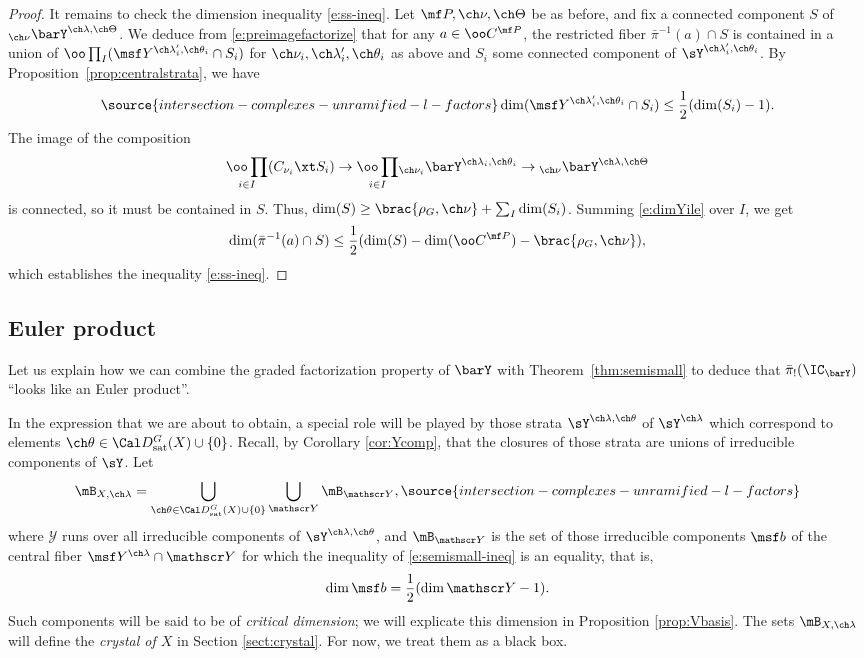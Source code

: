 \begin{proof}
It remains to check the dimension inequality \eqref{e:ss-ineq}.
Let $\mf P, \ch\nu, \ch\Theta$ be as before, and
fix a connected component $S$ of $_{\ch\nu}\barY^{\ch\lambda,\ch\Theta}$.
We deduce from
\eqref{e:preimagefactorize} that for any $a \in \oo C^{\mf P}$,
the restricted fiber
$\bar\pi^{-1}(a) \cap S$
is contained in a union of
$\oo\prod_I (\msf Y^{\ch\lambda'_i,\ch\theta_i}\cap S_i)$ for
$\ch\nu_i,\ch\lambda'_i,\ch\theta_i$ as above
and $S_i$ some connected component of $\sY^{\ch\lambda'_i,\ch\theta_i}$.
By Proposition~\ref{prop:centralstrata}, we have
\begin{equation}  \label{e:dimYile}
\source{intersection-complexes-unramified-l-factors}
\dim( \msf Y^{\ch\lambda'_i, \ch\theta_i} \cap S_i ) \le
\frac 1 2 ( \dim(S_i) - 1 ).
\end{equation}
The image of the composition
\[ \underset{i\in I}{\oo\prod} (C_{\nu_i} \xt S_i) \to \underset{i\in I}{\oo\prod}
{_{\ch\nu_i} \barY^{\ch\lambda_i,\ch\theta_i} } \to {_{\ch\nu}\barY^{\ch\lambda,\ch\Theta}} \]
is connected, so it must be contained in $S$.
Thus, $\dim(S) \ge \brac{\rho_G,\ch\nu} + \sum_I \dim(S_i)$.
Summing \eqref{e:dimYile} over $I$, we get
\[ \dim( \bar\pi^{-1}(a) \cap S ) \le
\frac 1 2 ( \dim(S) - \dim( \oo C^{\mf P} )- \brac{\rho_G,\ch\nu}  ), \]
which establishes the inequality \eqref{e:ss-ineq}.
\end{proof}

\subsection{Euler product}
Let us explain how we can combine the graded
factorization property of $\barY$ with
Theorem~\ref{thm:semismall} to deduce that
$\bar\pi_!(\IC_{\barY})$ ``looks like an Euler product''.

In the expression that we are about to obtain, a special role will be played by those strata $\sY^{\ch\lambda,\ch\theta}$ of $\sY^{\ch\lambda}$ which correspond to elements $\ch\theta\in \Cal D^G_{\mathrm{sat}}(X) \cup \{0\}$. Recall, by Corollary \ref{cor:Ycomp}, that the closures of those strata are unions of irreducible components of $\sY$. Let
\begin{equation}\label{e:crystallambda} \mB_{X,\ch\lambda} = \bigcup_{\ch\theta\in \Cal D^G_{\mathrm{sat}}(X) \cup \{0\}}\bigcup_{\mathscr Y} {\mB_{\mathscr Y}},
\source{intersection-complexes-unramified-l-factors}
\end{equation}
where $\mathscr Y$ runs over all irreducible components of $\sY^{\ch\lambda,\ch\theta}$, and ${\mB_{\mathscr Y}}$ is the set of those irreducible components $\msf b$ of the central fiber $\msf Y^{\ch\lambda}\cap \mathscr Y$ for which the inequality of \eqref{e:semismall-ineq} is an equality, that is,
\begin{equation}
 \dim\msf b = \frac{1}{2} (\dim \mathscr Y-1).
\end{equation}
Such components will be said to be of \emph{critical dimension}; we will explicate this dimension in Proposition \ref{prop:Vbasis}. The sets $\mB_{X,\ch\lambda}$ will define the \emph{crystal of $X$} in Section \ref{sect:crystal}. For now, we treat them as a black box.


